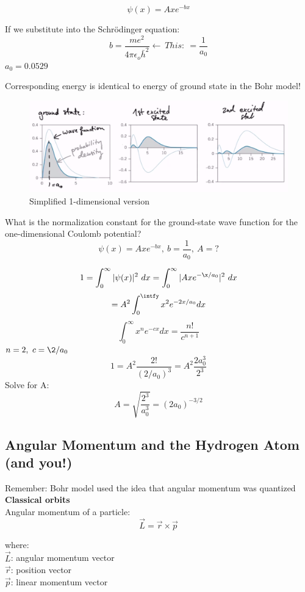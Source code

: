 \documentclass[class=article,crop=false]{standalone}
\begin{document}
$$ \psi(x) = A xe^{-bx} $$

If we substitute into the Schrödinger equation:
$$ b = \frac{me^2}{4\pi\epsilon_o\bar{h}^2} \leftarrow\ This: \ = \frac{1}{a_0} $$
$a_0 = 0.0529$

Corresponding energy is identical to energy of ground state in the Bohr model!\\


\begin{figure}[h!]
	\centering
	\includegraphics[width=0.9\linewidth]{./Images/probability_electrons.png}
	\caption{Simplified 1-dimensional version}
\end{figure}

\newpage
\begin{question}[Example]
	What is the normalization constant for the ground-state wave function for the one-dimensional Coulomb potential?
	$$ \psi(x) = Axe^{-bx},\ b = \frac{1}{a_0},\  A = ? $$
	\begin{answer}[Answer]
		$$ 1 = \int_0^\infty |\psi(x)|^2\ dx = \int_0^\infty |Axe^{-\x/a_0} |^2\ dx $$
		$$ = A^2 \int_0^\intfy x^2 e^{-2x/a_0} dx $$
		$$ \int_0^\infty x^n e^{-cx} dx = \frac{n!}{c^{n+1}} $$
		$ n = 2,\ c = \2/a_0 $ \\
		$$ 1 = A^2 \frac{2!}{(2/a_0)^3} = A^2 \frac{2a_0^3}{2^3} $$
		Solve for A:
		$$ A = \sqrt{\frac{2^3}{a_0^3}} = (2a_0)^{-3/2} $$
	\end{answer}
\end{question}

\subsection{Angular Momentum and the Hydrogen Atom (and you!)}
Remember: Bohr model used the idea that angular momentum was quantized \\

\textbf{Classical orbits} \\
Angular momentum of a particle:
$$ \vec{L} = \vec{r} \times \vec{p} $$

where: \\
$ \vec{L} $: angular momentum vector \\
$ \vec{r} $: position vector \\
$ \vec{p} $: linear momentum vector \\
\end{document}
